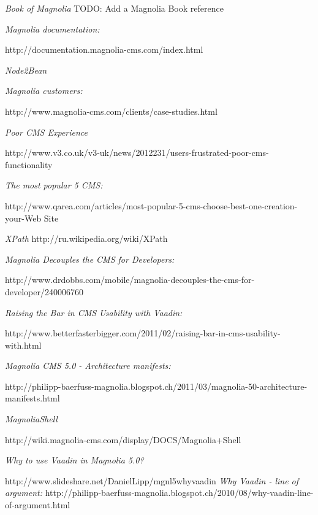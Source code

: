 \begin{thebibliography}{9}

\emph{Book of Magnolia}
TODO: Add a Magnolia Book reference

  \emph{Magnolia documentation:} 
  
  http://documentation.magnolia-cms.com/index.html
  
  \emph{Node2Bean}


  \emph{Magnolia customers:}
  
  http://www.magnolia-cms.com/clients/case-studies.html

  \emph{Poor CMS Experience}
  
  http://www.v3.co.uk/v3-uk/news/2012231/users-frustrated-poor-cms-functionality
  
  \emph{The most popular 5 CMS:} 
  
  http://www.qarea.com/articles/most-popular-5-cms-choose-best-one-creation-your-Web Site

  \emph{XPath}
  http://ru.wikipedia.org/wiki/XPath

  \emph{Magnolia Decouples the CMS for Developers:} 
  
  http://www.drdobbs.com/mobile/magnolia-decouples-the-cms-for-developer/240006760  
 
  \emph{Raising the Bar in CMS Usability with Vaadin:} 
  
  http://www.betterfasterbigger.com/2011/02/raising-bar-in-cms-usability-with.html
  
  \emph{Magnolia CMS 5.0 - Architecture manifests:} 
  
  http://philipp-baerfuss-magnolia.blogspot.ch/2011/03/magnolia-50-architecture-manifests.html
  
  \emph{MagnoliaShell} 
  
  http://wiki.magnolia-cms.com/display/DOCS/Magnolia+Shell
 
  \emph{Why to use Vaadin in Magnolia 5.0?} 
   
  http://www.slideshare.net/DanielLipp/mgnl5whyvaadin
 \emph{Why Vaadin - line of argument:}
  http://philipp-baerfuss-magnolia.blogspot.ch/2010/08/why-vaadin-line-of-argument.html
  

\end{thebibliography}
